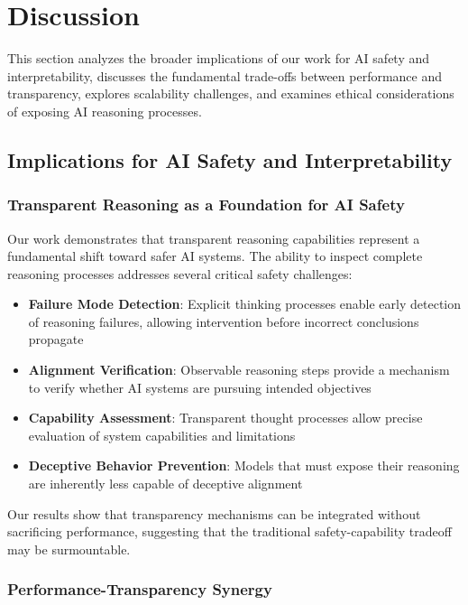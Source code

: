 \section{Discussion}
\label{sec:discussion}

This section analyzes the broader implications of our work for AI safety and interpretability, discusses the fundamental trade-offs between performance and transparency, explores scalability challenges, and examines ethical considerations of exposing AI reasoning processes.

\subsection{Implications for AI Safety and Interpretability}

\subsubsection{Transparent Reasoning as a Foundation for AI Safety}

Our work demonstrates that transparent reasoning capabilities represent a fundamental shift toward safer AI systems. The ability to inspect complete reasoning processes addresses several critical safety challenges:

\begin{itemize}
    \item \textbf{Failure Mode Detection}: Explicit thinking processes enable early detection of reasoning failures, allowing intervention before incorrect conclusions propagate
    \item \textbf{Alignment Verification}: Observable reasoning steps provide a mechanism to verify whether AI systems are pursuing intended objectives
    \item \textbf{Capability Assessment}: Transparent thought processes allow precise evaluation of system capabilities and limitations
    \item \textbf{Deceptive Behavior Prevention}: Models that must expose their reasoning are inherently less capable of deceptive alignment
\end{itemize}

Our results show that transparency mechanisms can be integrated without sacrificing performance, suggesting that the traditional safety-capability tradeoff may be surmountable.

\subsubsection{Performance-Transparency Synergy}

